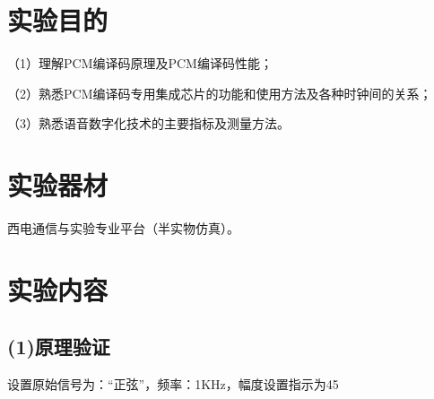 \documentclass{xjtureport}
\begin{document}
\begin{titlepage}
	
\end{titlepage}







\section{实验目的}
（1）理解PCM编译码原理及PCM编译码性能；

（2）熟悉PCM编译码专用集成芯片的功能和使用方法及各种时钟间的关系；

（3）熟悉语音数字化技术的主要指标及测量方法。

\section{实验器材}

西电通信与实验专业平台（半实物仿真）。

\section{实验内容}

\subsection*{(1)原理验证}

	设置原始信号为：“正弦”，频率：1KHz，幅度设置指示为45
\end{document}
